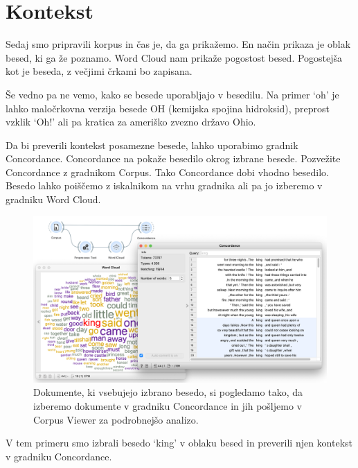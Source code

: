 \chapter{Kontekst}
\label{ch:kontekst}

Sedaj smo pripravili korpus in čas je, da ga prikažemo. En način prikaza je oblak besed, ki ga že poznamo. Word Cloud nam prikaže pogostost besed. Pogostejša kot je beseda, z večjimi črkami bo zapisana.

Še vedno pa ne vemo, kako se besede uporabljajo v besedilu. Na primer ‘oh’ je lahko maločrkovna verzija besede OH (kemijska spojina hidroksid), preprost vzklik ‘Oh!’ ali pa kratica za ameriško zvezno državo Ohio.

Da bi preverili kontekst posamezne besede, lahko uporabimo gradnik Concordance. Concordance na pokaže besedilo okrog izbrane besede.
Pozvežite Concordance z gradnikom Corpus. Tako Concordance dobi vhodno besedilo. Besedo lahko poiščemo z iskalnikom na vrhu gradnika ali pa jo izberemo v gradniku Word Cloud.

\begin{figure}[h]
  \includegraphics[width=\linewidth]{kontekst.png}%
  \caption{Dokumente, ki vsebujejo izbrano besedo, si pogledamo tako, da izberemo dokumente v gradniku Concordance in jih pošljemo v Corpus Viewer za podrobnejšo analizo. }
  \label{fig:003-kontekst}
\end{figure}

V tem primeru smo izbrali besedo ‘king’ v oblaku besed in preverili njen kontekst v gradniku Concordance.